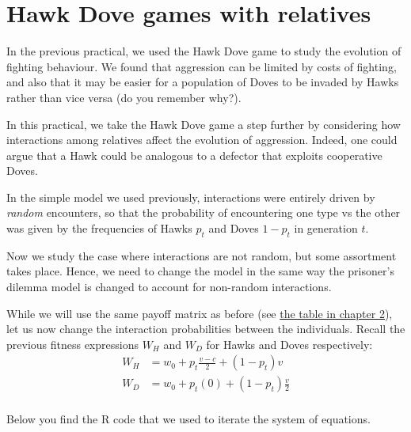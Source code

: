 \documentclass[
]{book}
\begin{document}
\hypertarget{hawk-dove-games-with-relatives}{%
\chapter{Hawk Dove games with relatives}\label{hawk-dove-games-with-relatives}}

In the previous practical, we used the Hawk Dove game to study the evolution of fighting behaviour. We found that aggression can be limited by costs of fighting, and also that it may be easier for a population of Doves to be invaded by Hawks rather than vice versa (do you remember why?).

In this practical, we take the Hawk Dove game a step further by considering how interactions among relatives affect the evolution of aggression. Indeed, one could argue that a Hawk could be analogous to a defector that exploits cooperative Doves.

In the simple model we used previously, interactions were entirely driven by \emph{random} encounters, so that the probability of encountering one type vs the other was given by the frequencies of Hawks \(p_{t}\) and Doves \(1-p_{t}\) in generation \(t\).

Now we study the case where interactions are not random, but some assortment takes place. Hence, we need to change the model in the same way the prisoner's dilemma model is changed to account for non-random interactions.

While we will use the same payoff matrix as before (see \protect\hyperlink{tab:payoffHD}{the table in chapter 2}), let us now change the interaction probabilities between the individuals. Recall the previous fitness expressions \(W_{H}\) and \(W_{D}\) for Hawks and Doves respectively:
\begin{align}
W_{H} &= w_{0} + p_{t} \frac{v-c}{2} + \left(1 - p_{t} \right) v \label{eq:wH} \\
W_{D} &= w_{0} + p_{t} (0) + \left(1 - p_{t} \right) \frac{v}{2} \label{eq:wD}\\
\end{align}

Below you find the R code that we used to iterate the system of equations.
\end{document}
